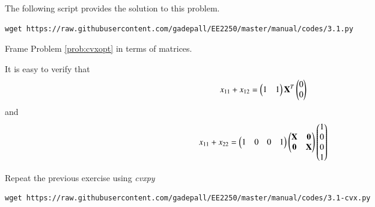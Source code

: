 \documentclass[journal,12pt,twocolumn]{IEEEtran}
\begin{document}
%
The following script provides the solution to this problem.
\begin{lstlisting}
wget https://raw.githubusercontent.com/gadepall/EE2250/master/manual/codes/3.1.py
\end{lstlisting}
%
\begin{problem}
Frame Problem \ref{prob:cvxopt} in terms of matrices.
\end{problem}
\solution
It is easy to verify that
\begin{equation}
x_{11} + x_{12} = 
\begin{pmatrix}
1 & 1
\end{pmatrix}
\mathbf{X}^{T}
\begin{pmatrix}
0 
\\
0
\end{pmatrix}
\end{equation}
and
\begin{equation}
x_{11} + x_{22} = 
\begin{pmatrix}
1 & 0 & 0 & 1
\end{pmatrix}
\begin{pmatrix}
\mathbf{X} & \mathbf{0} \\
\mathbf{0} & \mathbf{X}
\end{pmatrix}
\begin{pmatrix}
1
\\
0 
\\
0
\\
1
\end{pmatrix}
\end{equation}

\begin{problem}
Repeat the previous exercise using {\em cvxpy}
\end{problem}
%
\solution
\begin{lstlisting}
wget https://raw.githubusercontent.com/gadepall/EE2250/master/manual/codes/3.1-cvx.py
\end{lstlisting}
\end{document}
